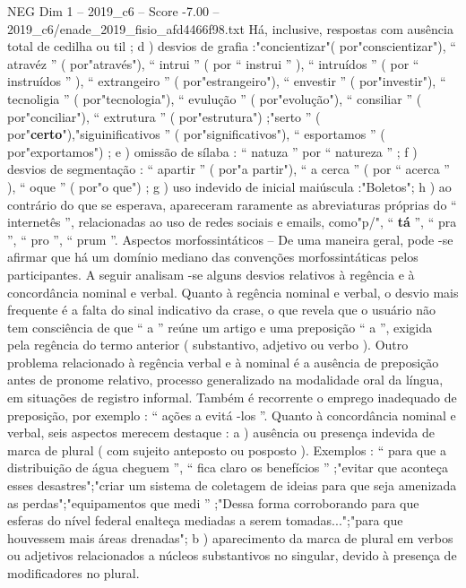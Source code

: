 \begin{textsample}{NEG Dim 1 – 2019\_c6 – Score -7.00 – 2019\_c6/enade\_2019\_fisio\_afd4466f98.txt}
Há, inclusive, respostas com ausência total de cedilha ou til ; d ) desvios de grafia :"concientizar"( por"conscientizar"), “ atravéz ” ( por"através"), “ intrui ” ( por “ instrui ” ), “ intruídos ” ( por “ instruídos ” ), “ extrangeiro ” ( por"estrangeiro"), “ envestir ” ( por"investir"), “ tecnoligia ” ( por"tecnologia"), “ evulução ” ( por"evolução"), “ consiliar ” ( por"conciliar"), “ extrutura ” ( por"estrutura") ;"serto ” ( por"\textbf{certo}"),"siguinificativos ” ( por"significativos"), “ esportamos ” ( por"exportamos") ; e ) omissão de sílaba : “ natuza ” por “ natureza ” ; f ) desvios de segmentação : “ apartir ” ( por"a partir"), “ a cerca ” ( por “ acerca ” ), “ oque ” ( por"o que") ; g ) uso indevido de inicial maiúscula :"Boletos"; h ) ao contrário do que se esperava, apareceram raramente as abreviaturas próprias do “ internetês ”, relacionadas ao uso de redes sociais e emails, como"p/", “ \textbf{tá} ”, “ pra ”, “ pro ”, “ prum ”.
Aspectos morfossintáticos – De uma maneira geral, pode -se afirmar que há um domínio mediano das convenções morfossintáticas pelos participantes.
A seguir analisam -se alguns desvios relativos à regência e à concordância nominal e verbal.
Quanto à regência nominal e verbal, o desvio mais frequente é a falta do sinal indicativo da crase, o que revela que o usuário não tem consciência de que “ a ” reúne um artigo e uma preposição “ a ”, exigida pela regência do termo anterior ( substantivo, adjetivo ou verbo ).
Outro problema relacionado à regência verbal e à nominal é a ausência de preposição antes de pronome relativo, processo generalizado na modalidade oral da língua, em situações de registro informal.
Também é recorrente o emprego inadequado de preposição, por exemplo : “ ações a evitá -los ”.
Quanto à concordância nominal e verbal, seis aspectos merecem destaque : a ) ausência ou presença indevida de marca de plural ( com sujeito anteposto ou posposto ).
Exemplos : “ para que a distribuição de água cheguem ”, “ fica claro os benefícios ” ;"evitar que aconteça esses desastres";"criar um sistema de coletagem de ideias para que seja amenizada as perdas";"equipamentos que medi ” ;"Dessa forma corroborando para que esferas do nível federal enalteça mediadas a serem tomadas...";"para que houvessem mais áreas drenadas"; b ) aparecimento da marca de plural em verbos ou adjetivos relacionados a núcleos substantivos no singular, devido à presença de modificadores no plural.

\end{textsample}
